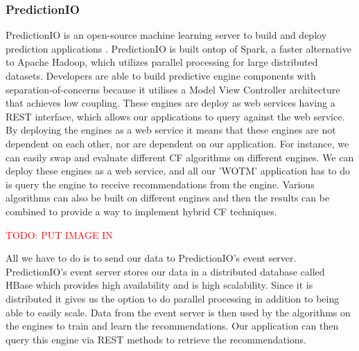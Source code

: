 
\subsubsection{PredictionIO}

PredictionIO is an open-source machine learning server to build and deploy prediction applications \cite{predictionio, predictionio2}. PredictionIO is built ontop of Spark, a faster alternative to Apache Hadoop, which utilizes parallel processing for large distributed datasets. Developers are able to build predictive engine components with separation-of-concerns because it utilises a Model View Controller architecture that achieves low coupling. These engines are deploy as web services having a REST interface, which allows our applications to query against the web service. By deploying the engines as a web service it means that these engines are not dependent on each other, nor are dependent on our application. For instance, we can easily swap and evaluate different CF algorithms on different engines. We can deploy these engines as a web service, and all our 'WOTM' application has to do is query the engine to receive recommendations from the engine. Various algorithms can also be built on different engines and then the results can be combined to provide a way to implement hybrid CF techniques. 

\textcolor{red}{TODO: PUT IMAGE IN}

All we have to do is to send our data to PredictionIO's event server. PredictionIO's event server stores our data in a distributed database called HBase which provides high availability and is high scalability. Since it is distributed it gives us the option to do parallel processing in addition to being able to easily scale. Data from the event server is then used by the algorithms on the engines to train and learn the recommendations. Our application can then query this engine via REST methods to retrieve the recommendations. 

